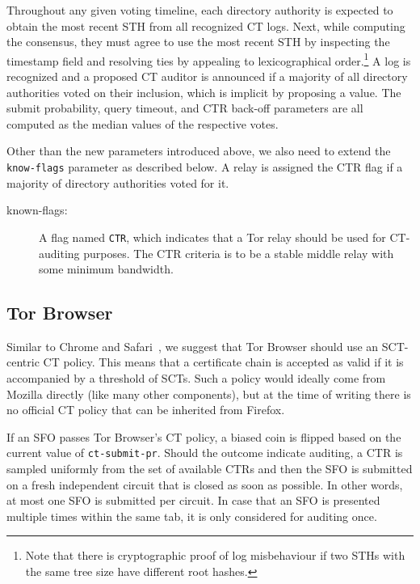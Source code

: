 Throughout any given voting timeline, each directory authority is expected to
obtain the most recent STH from all recognized CT logs.  Next, while computing
the consensus, they must agree to use the most recent STH by inspecting the
timestamp field and resolving ties by appealing to lexicographical
order.\footnote{%
	Note that there is cryptographic proof of log misbehaviour if two STHs with
	the same tree size have different root hashes.
}  A log is recognized and a proposed CT auditor is announced if a majority of
all directory authorities voted on their inclusion, which is implicit by
proposing a value.  The submit probability, query timeout, and CTR back-off
parameters are all computed as the median values of the respective votes.

Other than the new parameters introduced above, we also need to extend the
\texttt{know-flags} parameter as described below.  A relay is assigned the CTR
flag if a majority of directory authorities voted for it.
\begin{description}
	\item[known-flags:] A flag named \texttt{CTR}, which indicates
		that a Tor relay should be used for CT-auditing purposes.  The CTR
		criteria is to be a stable middle relay with some minimum bandwidth.
\end{description}

\subsection{Tor Browser}
Similar to Chrome and Safari~\cite{chrome-policy,safari-policy}, we suggest that
Tor Browser should use an SCT-centric CT policy.  This means that a certificate
chain is accepted as valid if it is accompanied by a threshold of SCTs.  Such a
policy would ideally come from Mozilla directly (like many other components),
but at the time of writing there is no official CT policy that can be inherited
from Firefox.

If an SFO passes Tor Browser's CT policy, a biased coin is flipped based on the
current value of \texttt{ct-submit-pr}.  Should the outcome indicate auditing,
a CTR is sampled uniformly from the set of available CTRs and then the SFO is
submitted on a fresh independent circuit that is closed as soon as possible.  In
other words, at most one SFO is submitted per circuit.  In case that an SFO is
presented multiple times within the same tab, it is only considered for auditing
once.


